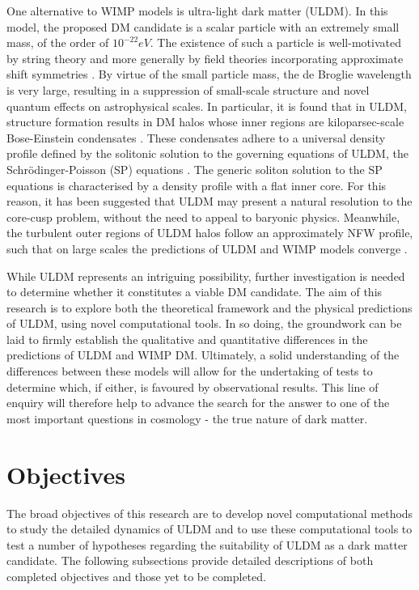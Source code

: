 One alternative to WIMP models is ultra-light dark matter (ULDM). In this model, the proposed DM candidate is a scalar particle with an extremely small mass, of the order of $10^{-22} eV$. The existence of such a particle is well-motivated by string theory  and more generally by field theories incorporating approximate shift symmetries \cite{Hui:2016ltb}. By virtue of the small particle mass, the de Broglie wavelength is very large, resulting in a suppression of small-scale structure and novel quantum effects on astrophysical scales. In particular, it is found that in ULDM, structure formation results in DM halos whose inner regions are kiloparsec-scale Bose-Einstein condensates \cite{Veltmaat:2018dfz}. These condensates adhere to a universal density profile defined by the solitonic solution to the governing equations of ULDM, the Schr{\"o}dinger-Poisson (SP) equations \cite{Marsh:2015xka}. The generic soliton solution to the SP equations is characterised by a density profile with a flat inner core. For this reason, it has been suggested that ULDM may present a natural resolution to the core-cusp problem, without the need to appeal to baryonic physics. Meanwhile, the turbulent outer regions of ULDM halos follow an approximately NFW profile, such that on large scales the predictions of ULDM and WIMP models converge \cite{Du:2016zcv}.

While ULDM represents an intriguing possibility, further investigation is needed to determine whether it constitutes a viable DM candidate. The aim of this research is to explore both the theoretical framework and the physical predictions of ULDM, using novel computational tools. In so doing, the groundwork can be laid to firmly establish the qualitative and quantitative differences in the predictions of ULDM and WIMP DM. Ultimately, a solid understanding of the differences between these models will allow for the undertaking of tests to determine which, if either, is favoured by observational results. This line of enquiry will therefore help to advance the search for the answer to one of the most important questions in cosmology - the true nature of dark matter. 


\section{Objectives}

The broad objectives of this research are to develop novel computational methods to study the detailed dynamics of ULDM and to use these computational tools to test a number of hypotheses regarding the suitability of ULDM as a dark matter candidate. The following subsections provide detailed descriptions of both completed objectives and those yet to be completed. 

